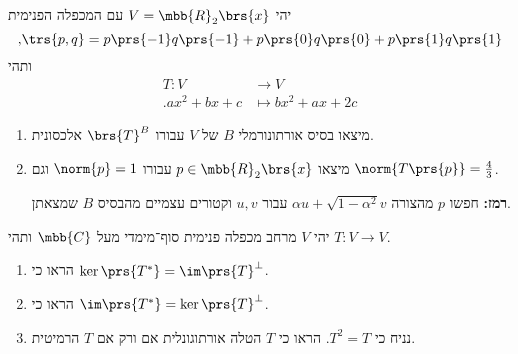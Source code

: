 \documentclass[a4paper,10pt,twoside,openany]{article}
\begin{document}
\begin{exercise}
יהי
$V = \mbb{R}_2\brs{x}$
עם המכפלה הפנימית
\[\text{,} \trs{p,q} = p\prs{-1} q\prs{-1} + p\prs{0} q\prs{0} + p\prs{1} q\prs{1}\]
ותהי
\begin{align*}
T \colon V &\to V \\
\text{.} ax^2 + bx + c &\mapsto bx^2 + ax + 2c
\end{align*}

\begin{enumerate}
\item מיצאו בסיס אורתונורמלי
$B$
של
$V$
עבורו
$\brs{T}^B$
אלכסונית.

\item מיצאו
$p \in \mbb{R}_2\brs{x}$
עבורו
$\norm{p} = 1$
וגם
$\norm{T\prs{p}} = \frac{4}{3}$.

\textbf{רמז:}
חפשו
$p$
מהצורה
$\alpha u + \sqrt{1 - \alpha^2} v$
עבור
$u,v$
וקטורים עצמיים מהבסיס
$B$
שמצאתן.
\end{enumerate}
\end{exercise}

\begin{exercise}
יהי
$V$
מרחב מכפלה פנימית סוף־מימדי מעל
$\mbb{C}$
ותהי
$T \colon V \to V$.

\begin{enumerate}
\item הראו כי
$\ker\prs{T^*} = \im\prs{T}^\perp$.
\item הראו כי
$\im\prs{T^*} = \ker\prs{T}^\perp$.
\item
נניח כי
$T^2 = T$.
הראו כי
$T$
הטלה אורתוגונלית אם ורק אם
$T$
הרמיטית.
\end{enumerate}
\end{exercise}
\end{document}
